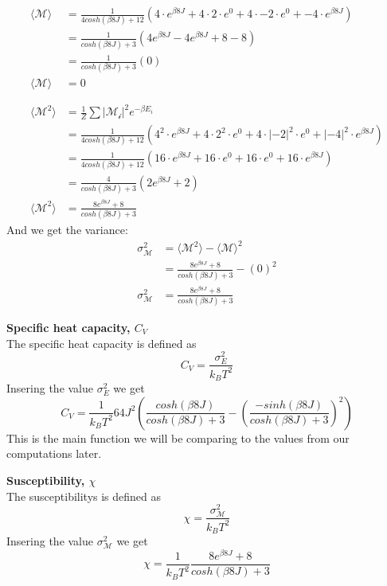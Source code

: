 \documentclass[../main.tex]{subfiles}
\begin{document}
    \begin{align*}
      \langle \mathcal{M} \rangle &= \frac{1}{4cosh(\beta 8J) + 12} \left( 4 \cdot e^{\beta8J} + 4 \cdot 2 \cdot e^{0} + 4 \cdot -2 \cdot e^{0} + -4 \cdot e^{\beta 8J} \right)\\
      &= \frac{1}{cosh(\beta 8J) + 3} \left( 4e^{\beta 8J}-4e^{\beta 8J} + 8 -8  \right)\\
      &=\frac{1}{cosh(\beta 8J) + 3} \left( 0 \right)\\
      \langle \mathcal{M} \rangle &=0\\
      &\\
      &\\
      \langle \mathcal{M}^2 \rangle &= \frac{1}{Z}\sum |\mathcal{M_i}|^2 e^{-\beta E_i}\\
      &= \frac{1}{4cosh(\beta 8J) + 12} \left( 4^2 \cdot e^{\beta8J} + 4 \cdot 2^2 \cdot e^{0} + 4 \cdot |-2|^2 \cdot e^{0} + |-4|^2 \cdot e^{\beta 8J} \right)\\
      &=\frac{1}{4cosh(\beta 8J) + 12} \left( 16 \cdot e^{\beta8J} + 16 \cdot e^{0} + 16 \cdot e^{0} + 16 \cdot e^{\beta 8J} \right)\\
      &=\frac{4}{cosh(\beta 8J) + 3} \left( 2 e^{\beta8J} +  2 \right)\\
      \langle \mathcal{M}^2 \rangle &=\frac{8 e^{\beta8J} +  8}{cosh(\beta 8J) + 3}
    \end{align*}
    And we get the variance:
    \begin{align*}
      \sigma^2_\mathcal{M} &= \langle \mathcal{M}^2 \rangle - \langle \mathcal{M} \rangle ^2\\
      &=\frac{8 e^{\beta8J} +  8}{cosh(\beta 8J) + 3} - \left(0\right)^2\\
      \sigma_\mathcal{M}^2 &=\frac{8 e^{\beta8J} +  8}{cosh(\beta 8J) + 3}
    \end{align*}


    \textbf{Specific heat capacity, $C_V$}\\
    The specific heat capacity is defined as
    \[C_V = \frac{\sigma_E^2}{k_B T^2}\]
    Insering the value $\sigma^2_E$ we get
      \[C_V = \frac{1}{k_B T^2}64J^2\left(\frac{cosh(\beta 8 J)}{cosh(\beta 8 J) + 3} -\left(\frac{-sinh(\beta 8 J)}{cosh(\beta 8 J) + 3}\right)^2  \right)\]
    This is the main function we will be comparing to the values from our computations later.

    \textbf{Susceptibility, $\chi$}\\
    The susceptibilitys is defined as
    \[\chi = \frac{\sigma^2_\mathcal{M}}{k_B T^2}\]
    Insering the value $\sigma^2_\mathcal{M}$ we get
    \[\chi = \frac{1}{k_B T^2}\frac{8 e^{\beta8J} +  8}{cosh(\beta 8J) + 3}\]
\end{document}
